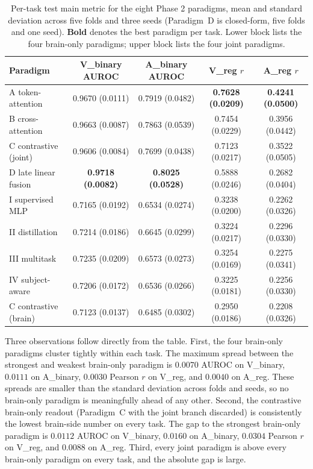 \documentclass[11pt, a4paper]{article}
\begin{document}
\begin{table}[h]
\centering
\caption{Per-task test main metric for the eight Phase 2 paradigms, mean and standard
deviation across five folds and three seeds (Paradigm~D is closed-form, five folds and
one seed). \textbf{Bold} denotes the best paradigm per task. Lower block lists the four
brain-only paradigms; upper block lists the four joint paradigms.}
\label{tab:per-task}
\small
\begin{tabular}{l S S S S}
\toprule
Paradigm & {V\_binary AUROC} & {A\_binary AUROC} & {V\_reg $r$} & {A\_reg $r$} \\
\midrule
A token-attention      & 0.9670 (0.0111) & 0.7919 (0.0482) & \textbf{0.7628 (0.0209)} & \textbf{0.4241 (0.0500)} \\
B cross-attention      & 0.9663 (0.0087) & 0.7863 (0.0539) & 0.7454 (0.0229) & 0.3956 (0.0442) \\
C contrastive (joint)  & 0.9606 (0.0084) & 0.7699 (0.0438) & 0.7123 (0.0217) & 0.3522 (0.0505) \\
D late linear fusion   & \textbf{0.9718 (0.0082)} & \textbf{0.8025 (0.0528)} & 0.5888 (0.0246) & 0.2682 (0.0404) \\
\midrule
I supervised MLP       & 0.7165 (0.0192) & 0.6534 (0.0274) & 0.3238 (0.0200) & 0.2262 (0.0326) \\
II distillation        & 0.7214 (0.0186) & 0.6645 (0.0299) & 0.3224 (0.0217) & 0.2296 (0.0330) \\
III multitask          & 0.7235 (0.0209) & 0.6573 (0.0273) & 0.3254 (0.0169) & 0.2275 (0.0341) \\
IV subject-aware       & 0.7206 (0.0172) & 0.6536 (0.0266) & 0.3225 (0.0181) & 0.2256 (0.0330) \\
\midrule
C contrastive (brain)  & 0.7123 (0.0137) & 0.6485 (0.0302) & 0.2950 (0.0186) & 0.2208 (0.0326) \\
\bottomrule
\end{tabular}
\end{table}

Three observations follow directly from the table. First, the four brain-only paradigms
cluster tightly within each task. The maximum spread between the strongest and weakest
brain-only paradigm is $0.0070$ AUROC on V\_binary, $0.0111$ on A\_binary, $0.0030$ Pearson
$r$ on V\_reg, and $0.0040$ on A\_reg. These spreads are smaller than the standard
deviation across folds and seeds, so no brain-only paradigm is meaningfully ahead of any
other. Second, the contrastive brain-only readout (Paradigm~C with the joint branch
discarded) is consistently the lowest brain-side number on every task. The gap to the
strongest brain-only paradigm is $0.0112$ AUROC on V\_binary, $0.0160$ on A\_binary,
$0.0304$ Pearson $r$ on V\_reg, and $0.0088$ on A\_reg. Third, every joint paradigm is
above every brain-only paradigm on every task, and the absolute gap is large.
\end{document}
